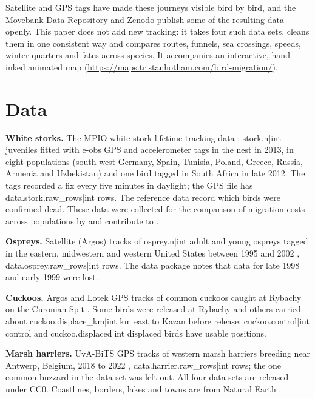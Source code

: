 \documentclass[11pt,a4paper]{article}
\begin{document}
Satellite and GPS tags have made these journeys visible bird by bird, and the Movebank Data Repository and Zenodo publish some of the resulting data openly. This paper does not add new tracking: it takes four such data sets, cleans them in one consistent way and compares routes, funnels, sea crossings, speeds, winter quarters and fates across species. It accompanies an interactive, hand-inked animated map (\url{https://maps.tristanhotham.com/bird-migration/}).

\section{Data}
\textbf{White storks.} The MPIO white stork lifetime tracking data \citep{flackdata}: {{stork.n|int}} juveniles fitted with e-obs GPS and accelerometer tags in the nest in 2013, in eight populations (south-west Germany, Spain, Tunisia, Poland, Greece, Russia, Armenia and Uzbekistan) and one bird tagged in South Africa in late 2012. The tags recorded a fix every five minutes in daylight; the GPS file has {{data.stork.raw_rows|int}} rows. The reference data record which birds were confirmed dead. These data were collected for the comparison of migration costs across populations by \citet{flack2016} and contribute to \citet{kays2015}.

\textbf{Ospreys.} Satellite (Argos) tracks of {{osprey.n|int}} adult and young ospreys tagged in the eastern, midwestern and western United States between 1995 and 2002 \citep{martelldata,martell2001}, {{data.osprey.raw_rows|int}} rows. The data package notes that data for late 1998 and early 1999 were lost.

\textbf{Cuckoos.} Argos and Lotek GPS tracks of common cuckoos caught at Rybachy on the Curonian Spit \citep{thorupdata,thorup2020}. Some birds were released at Rybachy and others carried about {{cuckoo.displace_km|int}} km east to Kazan before release; {{cuckoo.control|int}} control and {{cuckoo.displaced|int}} displaced birds have usable positions.

\textbf{Marsh harriers.} UvA-BiTS GPS tracks of western marsh harriers breeding near Antwerp, Belgium, 2018 to 2022 \citep{inbo}, {{data.harrier.raw_rows|int}} rows; the one common buzzard in the data set was left out. All four data sets are released under CC0. Coastlines, borders, lakes and towns are from Natural Earth \citep{naturalearth}.
\end{document}
